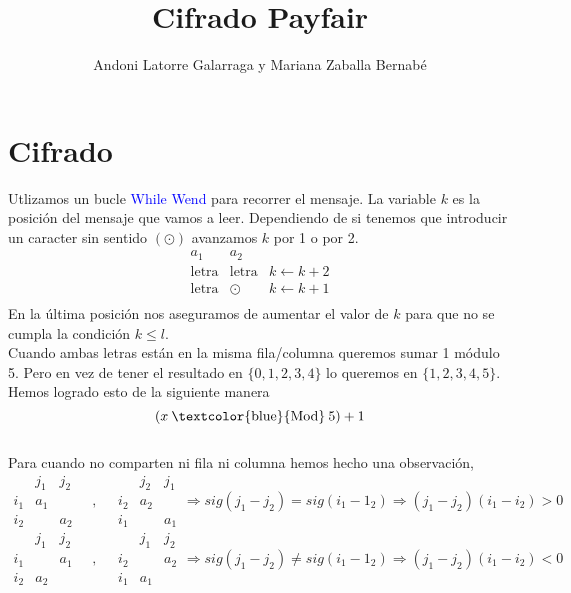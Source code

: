 \documentclass{article}
\title{Cifrado Payfair}
\author{Andoni Latorre Galarraga y Mariana Zaballa Bernabé}
\date{}
\begin{document}
\maketitle

\section*{Cifrado}

Utlizamos un bucle \textcolor{blue}{While Wend} para recorrer el mensaje. La variable $k$ es la posición del mensaje que vamos a leer. Dependiendo de si tenemos que introducir un caracter sin sentido $(\odot)$ avanzamos $k$ por 1 o por 2.
$$
\begin{array}{ccc}
    a_1 & a_2 &  \\
    \text{letra} & \text{letra} & k \leftarrow k + 2 \\
    \text{letra} & \odot & k \leftarrow k + 1 \\
\end{array}
$$
En la última posición nos aseguramos de aumentar el valor de $k$ para que no se cumpla la condición $k\le l$.
\\
Cuando ambas letras están en la misma fila/columna queremos sumar 1 módulo 5. Pero en vez de tener el resultado en $\{0,1,2,3,4\}$ lo queremos en $\{1,2,3,4,5\}$. Hemos logrado esto de la siguiente manera
$$
( x  \: \text{\textcolor{blue}{Mod}} \: 5 ) +1
$$
\\
Para cuando no comparten ni fila ni columna hemos hecho una observación,
$$
\begin{array}{c|ccc}
     & j_1 & j_2 \\ \hline
    i_1 & a_1 &  \\
    i_2 &  & a_2 
\end{array}\quad , \quad
\begin{array}{c|ccc}
    & j_2 & j_1 \\ \hline
   i_2 & a_2 &  \\
   i_1 &  & a_1 
\end{array}
\Rightarrow sig(j_1-j_2) = sig(i_1-1_2) \Rightarrow (j_1-j_2)(i_1-i_2) > 0
$$
$$
\begin{array}{c|ccc}
     & j_1 & j_2 \\ \hline
    i_1 &  & a_1 \\
    i_2 & a_2 & 
\end{array}\quad , \quad
\begin{array}{c|ccc}
    & j_1 & j_2 \\ \hline
    i_2 &  & a_2 \\
    i_1 & a_1 & 
\end{array}
\Rightarrow sig(j_1-j_2) \ne sig(i_1-1_2) \Rightarrow (j_1-j_2)(i_1-i_2) < 0
$$
\end{document}
